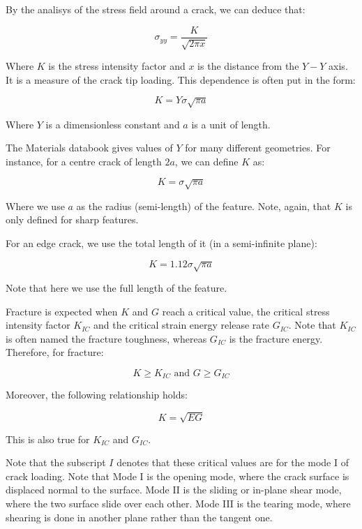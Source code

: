 \documentclass{article}
\begin{document}
\begin{definition}
    By the analisys of the stress field around a crack, we can deduce that:

    \[ \sigma_{yy} = \frac{K}{\sqrt{2\pi x}} \]

    Where $K$ is the stress intensity factor and $x$ is the distance from the $Y-Y$ axis. It is a measure of the crack tip loading. This dependence is often put in the form:

    \[ K = Y\sigma\sqrt{\pi a} \]

    Where $Y$ is a dimensionless constant and $a$ is a unit of length.
\end{definition}

\begin{example}
    The Materials databook gives values of $Y$ for many different geometries. For instance, for a centre crack of length $2a$, we can define $K$ as:

    \[ K = \sigma\sqrt{\pi a} \]

    Where we use $a$ as the radius (semi-length) of the feature. Note, again, that $K$ is only defined for sharp features.

    For an edge crack, we use the total length of it (in a semi-infinite plane):

    \[ K = 1.12\sigma\sqrt{\pi a} \]

    Note that here we use the full length of the feature.
\end{example}

\begin{proposition}
    Fracture is expected when $K$ and $G$ reach a critical value, the critical stress intensity factor $K_{IC}$ and the critical strain energy release rate $G_{IC}$. Note that $K_{IC}$ is often named the fracture toughness, whereas $G_{IC}$ is the fracture energy. Therefore, for fracture:

    \[ K \geq K_{IC}    \text{    and    }    G \geq G_{IC} \]

    Moreover, the following relationship holds:

    \[ K = \sqrt{EG} \]

    This is also true for $K_{IC}$ and $G_{IC}$.
\end{proposition}

Note that the subscript $I$ denotes that these critical values are for the mode I of crack loading. Note that Mode I is the opening mode, where the crack surface is displaced normal to the surface. Mode II is the sliding or in-plane shear mode, where the two surface slide over each other. Mode III is the tearing mode, where shearing is done in another plane rather than the tangent one.
\end{document}
